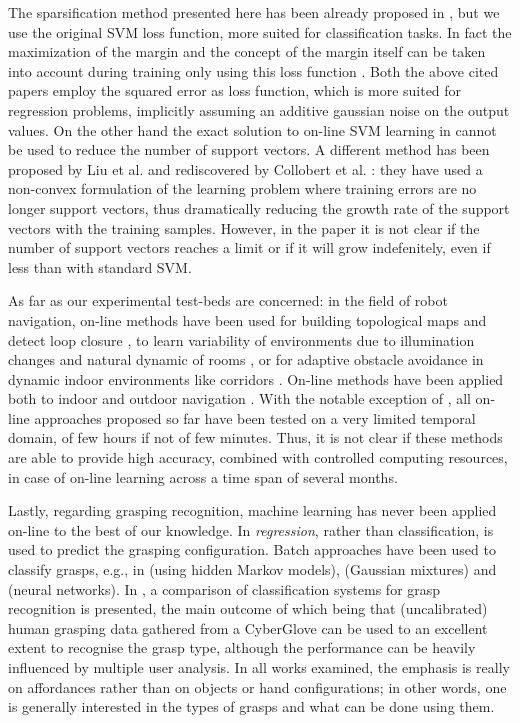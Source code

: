 The sparsification method presented here has been already proposed in
\cite{CsatoO01,EngelMM04}, but we use the original SVM loss function,
more suited for classification tasks. In fact the maximization of the
margin and the concept of the margin itself can be taken into account
during training only using this loss function \cite{Cristianini00}.
Both the above cited papers employ the squared error as loss function,
which is more suited for regression problems, implicitly assuming an
additive gaussian noise on the output values. On the other hand the
exact solution to on-line SVM learning in \cite{CauwenberghsP00}
cannot be used to reduce the number of support vectors. A different
method has been proposed by Liu et al. \cite{LiuSD05} and rediscovered
by Collobert et al. \cite{CollobertSWB06}: they have used a non-convex
formulation of the learning problem where training errors are no
longer support vectors, thus dramatically reducing the growth rate of
the support vectors with the training samples. However, in the paper
it is not clear if the number of support vectors reaches a limit or if
it will grow indefenitely, even if less than with standard SVM.

As far as our experimental test-beds are concerned: in the field of
robot navigation, on-line methods have been used for building
topological maps and detect loop closure
\cite{Tapus:Siegwart:ICRA2006}, to learn variability of environments
due to illumination changes and natural dynamic of rooms
\cite{luo07iros}, or for adaptive obstacle avoidance in dynamic indoor
environments like corridors \cite{Zeng:Weng:ICRA04}. On-line methods
have been applied both to indoor
\cite{luo07iros,Tapus:Siegwart:ICRA2006} and outdoor navigation
\cite{ljubjiana:icra02}.
With the notable exception of \cite{luo07iros}, all on-line approaches
proposed so far have been tested on a very limited temporal domain, of
few hours if not of few minutes. Thus, it is not clear if these
methods are able to provide high accuracy, combined with
controlled computing resources, in case of on-line learning across a
time span of several months.

Lastly, regarding grasping recognition, machine learning has never
been applied on-line to the best of our knowledge. In \cite{AR}
\emph{regression}, rather than classification, is used to predict the
grasping configuration. Batch approaches have been used to classify
grasps, e.g., in \cite{ekvall} (using hidden Markov models),
\cite{degranville} (Gaussian mixtures) and \cite{friedrich} (neural
networks). In \cite{heumer}, a comparison of classification systems
for grasp recognition is presented, the main outcome of which being
that (uncalibrated) human grasping data gathered from a CyberGlove can
be used to an excellent extent to recognise the grasp type, although
the performance can be heavily influenced by multiple user
analysis. In all works examined, the emphasis is really on affordances
\cite{gibson} rather than on objects or hand configurations; in other
words, one is generally interested in the types of grasps and what can
be done using them.

